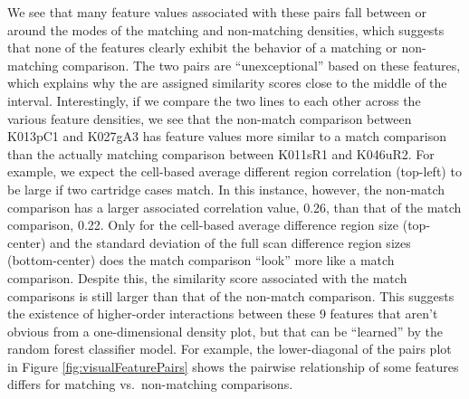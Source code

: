 \documentclass[11pt,]{isuthesis}
\begin{document}
We see that many feature values associated with these pairs fall between or around the modes of the matching and non-matching densities, which suggests that none of the features clearly exhibit the behavior of a matching or non-matching comparison.
The two pairs are ``unexceptional'' based on these features, which explains why the are assigned similarity scores close to the middle of the interval.
Interestingly, if we compare the two lines to each other across the various feature densities, we see that the non-match comparison between K013pC1 and K027gA3 has feature values more similar to a match comparison than the actually matching comparison between K011sR1 and K046uR2.
For example, we expect the cell-based average different region correlation (top-left) to be large if two cartridge cases match.
In this instance, however, the non-match comparison has a larger associated correlation value, 0.26, than that of the match comparison, 0.22.
Only for the cell-based average difference region size (top-center) and the standard deviation of the full scan difference region sizes (bottom-center) does the match comparison ``look'' more like a match comparison.
Despite this, the similarity score associated with the match comparisons is still larger than that of the non-match comparison.
This suggests the existence of higher-order interactions between these 9 features that aren't obvious from a one-dimensional density plot, but that can be ``learned'' by the random forest classifier model.
For example, the lower-diagonal of the pairs plot in Figure \ref{fig:visualFeaturePairs} shows the pairwise relationship of some features differs for matching vs.~non-matching comparisons.
\end{document}
